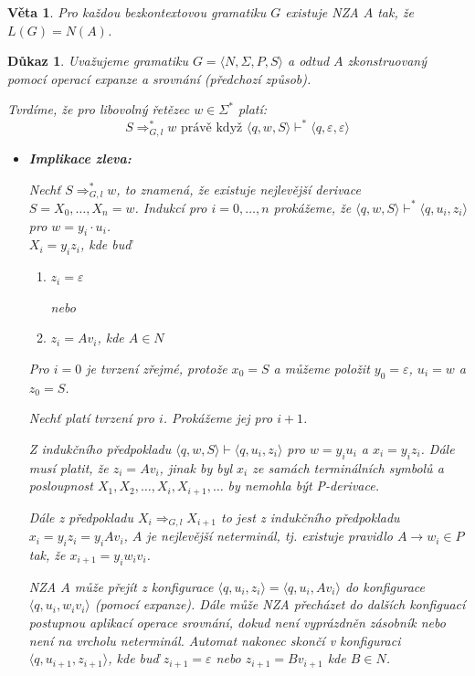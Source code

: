 \documentclass[10pt, a4paper, titlepage]{article}
\theoremstyle{note}
\newtheorem{dukaz}{Důkaz}
\newtheorem{veta}{Věta}
\begin{document}
\begin{veta}
Pro každou bezkontextovou gramatiku $G$ existuje NZA $A$ tak, že $L(G)=N(A)$.
\end{veta}

\begin{dukaz}
Uvažujeme gramatiku $G=\langle N,\Sigma,P,S \rangle$ a odtud $A$ zkonstruovaný pomocí operací expanze a srovnání (předchozí způsob).

Tvrdíme, že pro libovolný řetězec $w \in \Sigma^*$ platí:
$$
S \Rightarrow_{G,l}^* w \text{ právě když } \langle q,w,S \rangle \vdash^* \langle q,\varepsilon,\varepsilon \rangle
$$

\begin{itemize}
\item
\textbf{Implikace zleva:}

Nechť $S \Rightarrow_{G,l}^* w$, to znamená, že existuje nejlevější derivace $S=X_0,\ldots,X_n=w$. Indukcí pro $i=0,\ldots,n$ prokážeme, že $\langle q,w,S \rangle \vdash^* \langle q,u_i,z_i \rangle$ pro $w = y_i\cdot u_i$. \\
$X_i=y_iz_i$, kde buď 
\begin{enumerate}
\item
$z_i = \varepsilon$

nebo
\item
$z_i=Av_i$, kde $A \in N$
\end{enumerate}

Pro $i=0$ je tvrzení zřejmé, protože $x_0=S$ a můžeme položit $y_0=\varepsilon$, $u_i=w$ a $z_0=S$.

Nechť platí tvrzení pro $i$. Prokážeme jej pro $i+1$.

Z indukčního předpokladu $\langle q,w,S \rangle \vdash \langle q,u_i,z_i \rangle$ pro $w=y_iu_i$ a $x_i=y_iz_i$. Dále musí platit, že $z_i=Av_i$, jinak by byl $x_i$ ze samách terminálních symbolů a posloupnost $X_1,X_2,\ldots,X_i,X_{i+1},\ldots$ by nemohla být P-derivace.

Dále z předpokladu $X_i \Rightarrow_{G,l}X_{i+1}$ to jest z indukčního předpokladu $x_i=y_iz_i=y_iAv_i$, $A$ je nejlevější neterminál, tj. existuje pravidlo $A \rightarrow w_i \in P$ tak, že $x_{i+1}=y_iw_iv_i$.

NZA $A$ může přejít z konfigurace $\langle q,u_i,z_i \rangle = \langle q,u_i,Av_i \rangle$ do konfigurace $\langle q,u_i,w_iv_i \rangle$ (pomocí expanze). Dále může NZA přecházet do dalších konfiguací postupnou aplikací operace srovnání, dokud není vyprázdněn zásobník nebo není na vrcholu neterminál.
Automat nakonec skončí v konfiguraci $\langle q,u_{i+1},z_{i+1} \rangle$, kde buď $z_{i+1}=\varepsilon$ nebo $z_{i+1}=Bv_{i+1}$ kde $B \in N$.


\end{itemize}
\end{dukaz}
\end{document}
